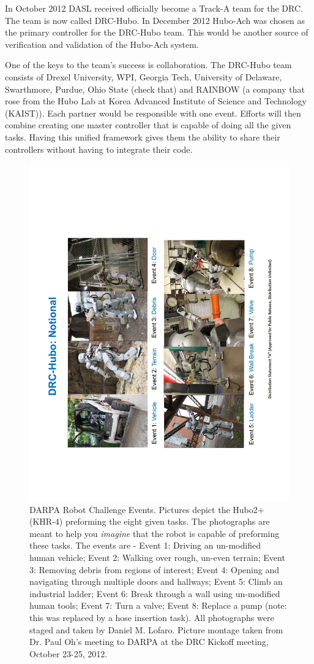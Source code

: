 In October 2012 DASL received officially become a Track-A team for the DRC.
The team is now called DRC-Hubo.
In December 2012 Hubo-Ach was chosen as the primary controller for the DRC-Hubo team.
This would be another source of verification and validation of the Hubo-Ach system.

One of the keys to the team's success is collaboration.
The DRC-Hubo team consists of Drexel University, WPI, Georgia Tech, University of Delaware, Swarthmore, Purdue, Ohio State (check that) and RAINBOW (a company that rose from the Hubo Lab at Korea Advanced Institute of Science and Technology (KAIST)).
Each partner would be responsible with one event.
Efforts will then combine creating one master controller that is capable of doing all the given tasks.
Having this unified framework gives them the ability to share their controllers without having to integrate their code.  

\begin{figure}[thpb]
  \centering
\includegraphics[height=1.0\columnwidth, angle=-90]{./background/pix/drcEvents.pdf}
  \caption{DARPA Robot Challenge Events.  Pictures depict the Hubo2+ (KHR-4) preforming the eight given tasks.  The photographs are meant to help you \textit{imagine} that the robot is capable of preforming these tasks.  The events are - Event 1: Driving an un-modified human vehicle; Event 2: Walking over rough, un-even terrain; Event 3: Removing debris from regions of interest; Event 4: Opening and navigating through multiple doors and hallways; Event 5: Climb an industrial ladder; Event 6: Break through a wall using un-modified human tools; Event 7: Turn a valve; Event 8: Replace a pump (note: this was replaced by a hose insertion task).  All photographs were staged and taken by Daniel M. Lofaro.  Picture montage taken from Dr. Paul Oh's meeting to DARPA at the DRC Kickoff meeting, October 23-25, 2012.\cite{drOhDARPA}    }
  \label{fig:drcEvents}
\end{figure}

